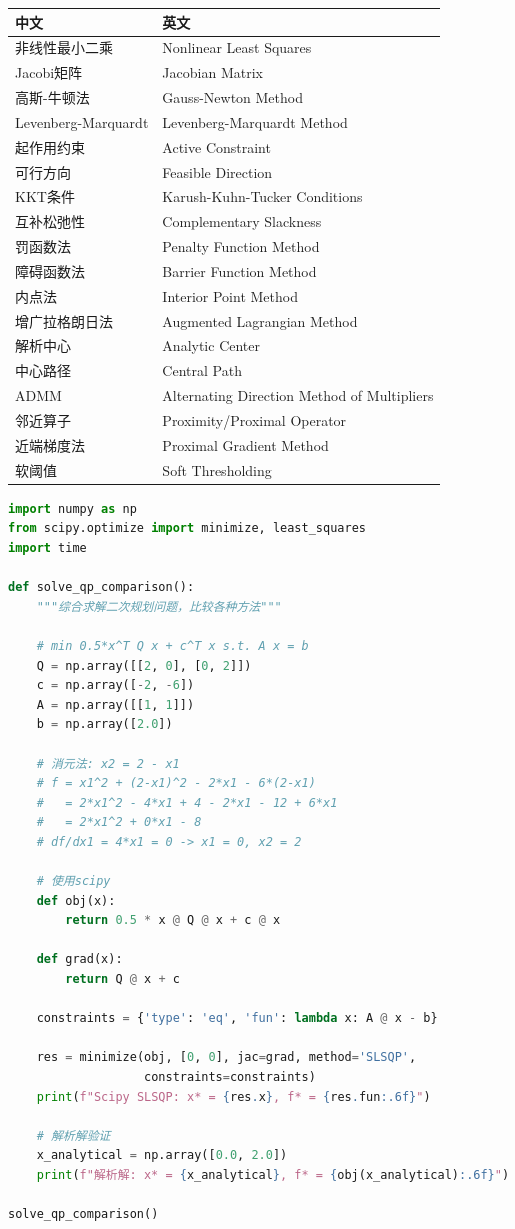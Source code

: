 \begin{table}[htbp]
\centering
\begin{tabular}{@{}ll@{}}
\toprule
\textbf{中文} & \textbf{英文} \\
\midrule
非线性最小二乘 & Nonlinear Least Squares \\
Jacobi矩阵 & Jacobian Matrix \\
高斯-牛顿法 & Gauss-Newton Method \\
Levenberg-Marquardt & Levenberg-Marquardt Method \\
起作用约束 & Active Constraint \\
可行方向 & Feasible Direction \\
KKT条件 & Karush-Kuhn-Tucker Conditions \\
互补松弛性 & Complementary Slackness \\
罚函数法 & Penalty Function Method \\
障碍函数法 & Barrier Function Method \\
内点法 & Interior Point Method \\
增广拉格朗日法 & Augmented Lagrangian Method \\
解析中心 & Analytic Center \\
中心路径 & Central Path \\
ADMM & Alternating Direction Method of Multipliers \\
邻近算子 & Proximity/Proximal Operator \\
近端梯度法 & Proximal Gradient Method \\
软阈值 & Soft Thresholding \\
\bottomrule
\end{tabular}
\end{table}

\begin{lstlisting}[language=Python, caption=综合比较代码]
import numpy as np
from scipy.optimize import minimize, least_squares
import time

def solve_qp_comparison():
    """综合求解二次规划问题，比较各种方法"""
    
    # min 0.5*x^T Q x + c^T x s.t. A x = b
    Q = np.array([[2, 0], [0, 2]])
    c = np.array([-2, -6])
    A = np.array([[1, 1]])
    b = np.array([2.0])
    
    # 消元法: x2 = 2 - x1
    # f = x1^2 + (2-x1)^2 - 2*x1 - 6*(2-x1)
    #   = 2*x1^2 - 4*x1 + 4 - 2*x1 - 12 + 6*x1
    #   = 2*x1^2 + 0*x1 - 8
    # df/dx1 = 4*x1 = 0 -> x1 = 0, x2 = 2
    
    # 使用scipy
    def obj(x):
        return 0.5 * x @ Q @ x + c @ x
    
    def grad(x):
        return Q @ x + c
    
    constraints = {'type': 'eq', 'fun': lambda x: A @ x - b}
    
    res = minimize(obj, [0, 0], jac=grad, method='SLSQP',
                   constraints=constraints)
    print(f"Scipy SLSQP: x* = {res.x}, f* = {res.fun:.6f}")
    
    # 解析解验证
    x_analytical = np.array([0.0, 2.0])
    print(f"解析解: x* = {x_analytical}, f* = {obj(x_analytical):.6f}")

solve_qp_comparison()
\end{lstlisting}

\newpage

